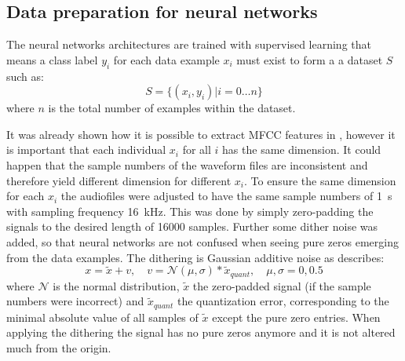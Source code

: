 
\subsection{Data preparation for neural networks}\label{sec:exp_data_prep}
The neural networks architectures are trained with supervised learning that means a class label $y_i$ for each data example $x_i$ must exist to form a a dataset $S$ such as:
\begin{equation}\label{eq:exp_dataset}
  S = \{ (x_i, y_i) | i = 0 \dots n \}
\end{equation}
where $n$ is the total number of examples within the dataset.

It was already shown how it is possible to extract MFCC features in , however it is important that each individual $x_i$ for all $i$ has the same dimension.
It could happen that the sample numbers of the waveform files are inconsistent and therefore yield different dimension for different $x_i$.
To ensure the same dimension for each $x_i$ the audiofiles were adjusted to have the same sample numbers of \SI{1}{\second} with sampling frequency \SI{16}{\kilo\hertz}.
This was done by simply zero-padding the signals to the desired length of 16000 samples.
Further some dither noise was added, so that neural networks are not confused when seeing pure zeros emerging from the data examples.
The dithering is Gaussian additive noise as describes:
\begin{equation}\label{eq:exp_dither}
  x = \tilde{x} + v, \quad v = \mathcal{N}(\mu, \sigma) * \tilde{x}_{quant}, \quad \mu, \sigma = 0, 0.5
\end{equation}
where $\mathcal{N}$ is the normal distribution, $\tilde{x}$ the zero-padded signal (if the sample numbers were incorrect) and $\tilde{x}_{quant}$ the quantization error, corresponding to the minimal absolute value of all samples of $\tilde{x}$ except the pure zero entries.
When applying the dithering the signal has no pure zeros anymore and it is not altered much from the origin.

